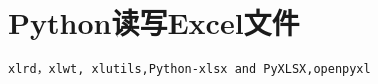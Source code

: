 
\section{Python读写Excel文件}
\begin{verbatim}
xlrd，xlwt, xlutils,Python-xlsx and PyXLSX,openpyxl
\end{verbatim}

